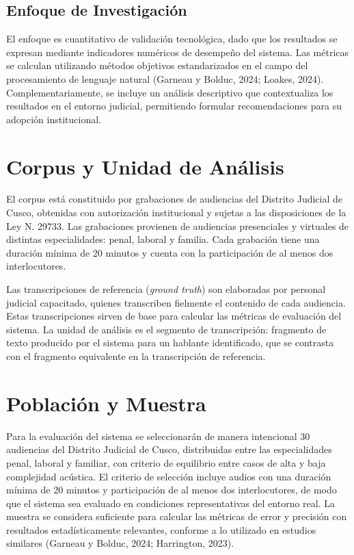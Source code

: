 \documentclass[12pt,a4paper,oneside]{report}
\begin{document}
\subsection{Enfoque de Investigación}

El enfoque es cuantitativo de validación tecnológica, dado que los resultados se expresan mediante indicadores numéricos de desempeño del sistema. Las métricas se calculan utilizando métodos objetivos estandarizados en el campo del procesamiento de lenguaje natural (Garneau y Bolduc, 2024; Loakes, 2024). Complementariamente, se incluye un análisis descriptivo que contextualiza los resultados en el entorno judicial, permitiendo formular recomendaciones para su adopción institucional.

\section{Corpus y Unidad de Análisis}

El corpus está constituido por grabaciones de audiencias del Distrito Judicial de Cusco, obtenidas con autorización institucional y sujetas a las disposiciones de la Ley N.\textordmasculine{} 29733. Las grabaciones provienen de audiencias presenciales y virtuales de distintas especialidades: penal, laboral y familia. Cada grabación tiene una duración mínima de 20 minutos y cuenta con la participación de al menos dos interlocutores.

Las transcripciones de referencia (\textit{ground truth}) son elaboradas por personal judicial capacitado, quienes transcriben fielmente el contenido de cada audiencia. Estas transcripciones sirven de base para calcular las métricas de evaluación del sistema. La unidad de análisis es el segmento de transcripción: fragmento de texto producido por el sistema para un hablante identificado, que se contrasta con el fragmento equivalente en la transcripción de referencia.

\section{Población y Muestra}

Para la evaluación del sistema se seleccionarán de manera intencional 30 audiencias del Distrito Judicial de Cusco, distribuidas entre las especialidades penal, laboral y familiar, con criterio de equilibrio entre casos de alta y baja complejidad acústica. El criterio de selección incluye audios con una duración mínima de 20 minutos y participación de al menos dos interlocutores, de modo que el sistema sea evaluado en condiciones representativas del entorno real. La muestra se considera suficiente para calcular las métricas de error y precisión con resultados estadísticamente relevantes, conforme a lo utilizado en estudios similares (Garneau y Bolduc, 2024; Harrington, 2023).
\end{document}
